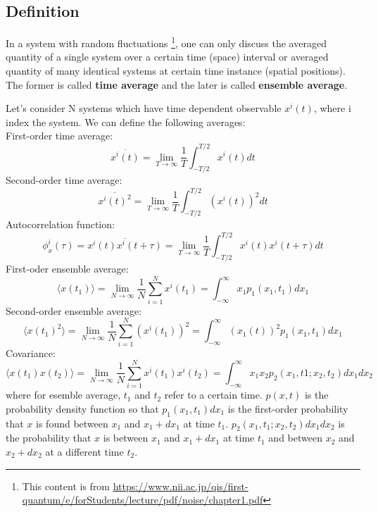 \documentclass{article}
\begin{document}
\subsection*{Definition}
In a system with random fluctuations
\footnote{This content is from \url{https://www.nii.ac.jp/qis/first-quantum/e/forStudents/lecture/pdf/noise/chapter1.pdf}}, 
one can only discuss the averaged quantity of a single system over a certain
time (space) interval or averaged quantity of many identical systems at certain 
time instance (spatial positions). The former is called \textbf{time average} and 
the later is called \textbf{ensemble average}. 

Let's consider N systems which have time dependent observable $x^{i}(t)$, where
i index the system. We can define the following averages: \\
First-order time average: 
\begin{equation}
    \overline{x^i(t)} = \lim_{T\to\infty} \frac{1}{T} \int_{-T/2}^{T/2} x^i(t) dt
\end{equation}
Second-order time average:
\begin{equation}
    \overline{x^i(t)^2} = \lim_{T\to\infty} \frac{1}{T} \int_{-T/2}^{T/2} \left( x^i(t) \right)^2 dt
\end{equation}
Autocorrelation function:
\begin{equation}
    \phi_x^i(\tau) = \overline{x^i(t)x^i(t+\tau)} 
    = \lim_{T\to\infty} \frac{1}{T} \int_{-T/2}^{T/2} x^i(t) x^i(t+\tau) dt
\end{equation}
First-oder ensemble average:
\begin{equation}
    \langle x(t_1) \rangle = \lim_{N\to\infty} \frac{1}{N} \sum_{i=1}^{N} x^i(t_1) 
        = \int_{-\infty}^{\infty} x_1 p_1(x_1, t_1) dx_1
\end{equation}
Second-order ensemble average:
\begin{equation}
    \langle x(t_1)^2 \rangle = \lim_{N\to\infty} \frac{1}{N} \sum_{i=1}^{N} \left( x^i(t_1) \right)^2  
        = \int_{-\infty}^{\infty} \left( x_1(t) \right)^2  p_1(x_1, t_1) dx_1
\end{equation}
Covariance:
\begin{equation}
    \langle x(t_1)x(t_2) \rangle = \lim_{N\to\infty} \frac{1}{N} \sum_{i=1}^{N}  x^i(t_1) x^i(t_2)
        = \int_{-\infty}^{\infty} x_1 x_2 p_2(x_1, t1; x_2, t_2) dx_1 dx_2
\end{equation}
where for esemble average, $t_1$ and $t_2$ refer to a certain time. $p(x,t)$ is the 
probability density function so that $p_1(x_1,t_1)dx_1$ is the 
first-order probability that $x$ is found between $x_1$ and $x_1 + dx_1$ at time $t_1$. 
$p_2(x_1, t_1; x_2, t_2)dx_1 dx_2$ is the probability that $x$ is between $x_1$ and $x_1 + dx_1$
at time $t_1$ and between $x_2$ and $x_2 + dx_2$ at a different time $t_2$.
\end{document}
